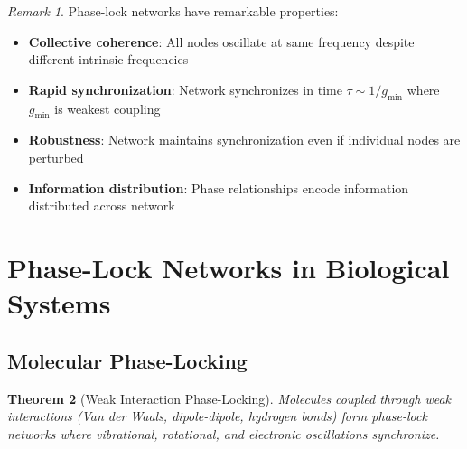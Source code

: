 \documentclass[11pt]{article}
\newtheorem{theorem}{Theorem}[section]
\theoremstyle{remark}
\newtheorem{remark}[theorem]{Remark}
\begin{document}
\begin{remark}
Phase-lock networks have remarkable properties:
\begin{itemize}
\item \textbf{Collective coherence}: All nodes oscillate at same frequency despite different intrinsic frequencies
\item \textbf{Rapid synchronization}: Network synchronizes in time $\tau \sim 1/g_{\text{min}}$ where $g_{\text{min}}$ is weakest coupling
\item \textbf{Robustness}: Network maintains synchronization even if individual nodes are perturbed
\item \textbf{Information distribution}: Phase relationships encode information distributed across network
\end{itemize}
\end{remark}

\section{Phase-Lock Networks in Biological Systems}

\subsection{Molecular Phase-Locking}

\begin{theorem}[Weak Interaction Phase-Locking]
\label{thm:weak_interaction_locking}
Molecules coupled through weak interactions (Van der Waals, dipole-dipole, hydrogen bonds) form phase-lock networks where vibrational, rotational, and electronic oscillations synchronize.
\end{theorem}
\end{document}
